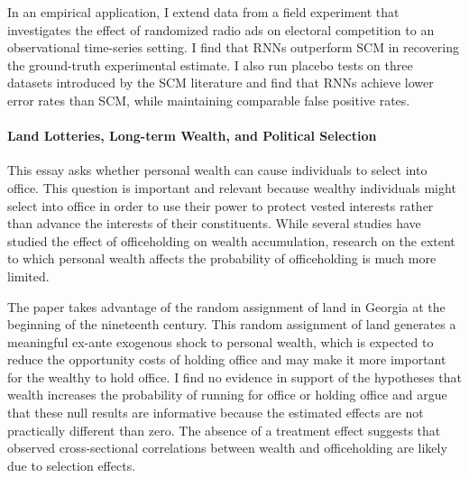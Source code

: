 In an empirical application, I extend data from a field experiment that investigates the effect of randomized radio ads on electoral competition to an observational time-series setting. I find that RNNs outperform SCM in recovering the ground-truth experimental estimate. I also run placebo tests on three datasets introduced by the SCM literature and find that RNNs achieve lower error rates than SCM, while maintaining comparable false positive rates.


\paragraph*{Land Lotteries, Long-term Wealth, and Political Selection} 
This essay asks whether personal wealth can cause individuals to select into office. This question is important and relevant because wealthy individuals might select into office in order to use their power to protect vested interests rather than advance the interests of their constituents. While several studies have studied the effect of officeholding on wealth accumulation, research on the extent to which personal wealth affects the probability of officeholding is much more limited.

The paper takes advantage of the random assignment of land in Georgia at the beginning of the nineteenth century. This random assignment of land generates a meaningful ex-ante exogenous shock to personal wealth, which is expected to reduce the opportunity costs of holding office and may make it more important for the wealthy to hold office. I find no evidence in support of the hypotheses that wealth increases the probability of running for office or holding office and argue that these null results are informative because the estimated effects are not practically different than zero. The absence of a treatment effect suggests that observed cross-sectional correlations between wealth and officeholding are likely due to selection effects. 